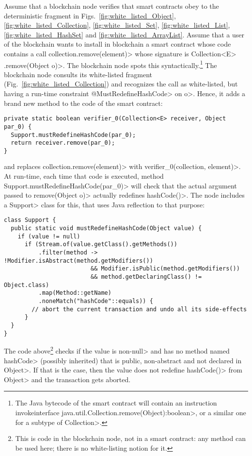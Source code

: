 Assume that a blockchain node verifies that smart contracts obey to the deterministic
fragment in Figs.~\ref{fig:white_listed_Object}, \ref{fig:white_listed_Collection},
\ref{fig:white_listed_Set}, \ref{fig:white_listed_List},
\ref{fig:white_listed_HashSet} and \ref{fig:white_listed_ArrayList}.
Assume that a user of the blockchain wants to install in blockchain a smart contract whose
code contains a call \<collection.remove(element)> whose signature is
\<Collection$\text{<}$E$\text{>}$.remove(Object o)>.
The blockchain node spots this syntactically.\footnote{The Java bytecode of the
  smart contract will
  contain an instruction \<invokeinterface java.util.Collection.remove(Object):boolean>,
  or a similar one for a subtype of \<Collection>.}
The blockchain node consults its white-listed fragment (Fig.~\ref{fig:white_listed_Collection})
and recognizes the call as
white-listed, but having a run-time constraint \<@MustRedefineHashCode> on \<o>. Hence, it
adds a brand new method to the code of the smart contract:
%
\begin{verbatim}
private static boolean verifier_0(Collection<E> receiver, Object par_0) {
  Support.mustRedefineHashCode(par_0);
  return receiver.remove(par_0);
}
\end{verbatim}
%
and replaces \<collection.remove(element)> with \<verifier\_0(collection, element)>.
At run-time, each time that code is executed, method
\<Support.mustRedefineHashCode(par\_0)> will check that the actual argument
passed to \<remove(Object o)> actually redefines \<hashCode()>. The node includes a
\<Support> class for this, that uses Java reflection to that purpose:
%
\begin{verbatim}
class Support {
  public static void mustRedefineHashCode(Object value) {
    if (value != null)
      if (Stream.of(value.getClass().getMethods())
          .filter(method -> !Modifier.isAbstract(method.getModifiers())
                         && Modifier.isPublic(method.getModifiers())
                         && method.getDeclaringClass() != Object.class)
          .map(Method::getName)
          .noneMatch("hashCode"::equals)) {
        // abort the current transaction and undo all its side-effects
      }
  }
}
\end{verbatim}
%
The code above\footnote{This is code in the blockchain node, not in a smart contract:
  any method can be used here; there is no white-listing notion for it.}
checks if the value is non-\<null> and has no method
named \<hashCode>
(possibly inherited) that is public, non-abstract and not declared in \<Object>.
If that is the case, then the value does not redefine \<hashCode()> from \<Object>
and the transaction gets aborted.

